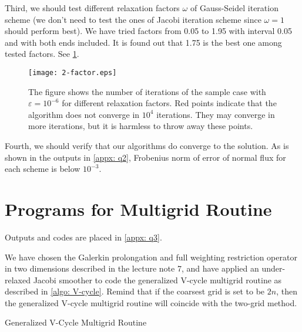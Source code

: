 \documentclass{assignment}[2019/10/15]
\begin{document}
    Third, we should test different relaxation factors $\omega$ of Gauss-Seidel iteration scheme (we don't need to test the ones of Jacobi iteration scheme since $\omega = 1$ should perform best). We have tried factors from 0.05 to 1.95 with interval 0.05 and with both ends included. It is found out that 1.75 is the best one among tested factors. See \ref{fig: q2}.

    \begin{figure}[htb]
        \centering
        \texttt{[image: 2-factor.eps]}
        \caption{The figure shows the number of iterations of the sample case with $\varepsilon=10^{-6}$ for different relaxation factors. Red points indicate that the algorithm does not converge in $10^4$ iterations. They may converge in more iterations, but it is harmless to throw away these points.}
        \label{fig: q2}
    \end{figure}

    Fourth, we should verify that our algorithms do converge to the solution. As is shown in the outputs in \ref{appx: q2}, Frobenius norm of error of normal flux for each scheme is below $10^{-3}$.

    \section{Programs for Multigrid Routine}

    Outputs and codes are placed in \ref{appx: q3}.

    We have chosen the Galerkin prolongation and full weighting restriction operator in two dimensions described in the lecture note 7, and have applied an under-relaxed Jacobi smoother to code the generalized V-cycle multigrid routine as described in \ref{algo: V-cycle}. Remind that if the coarsest grid is set to be $2n$, then the generalized V-cycle multigrid routine will coincide with the two-grid method.

    \begin{algorithm}[htb]
        \caption{Generalized V-Cycle Multigrid Routine}
        \label{algo: V-cycle}


    \end{algorithm}
\end{document}
